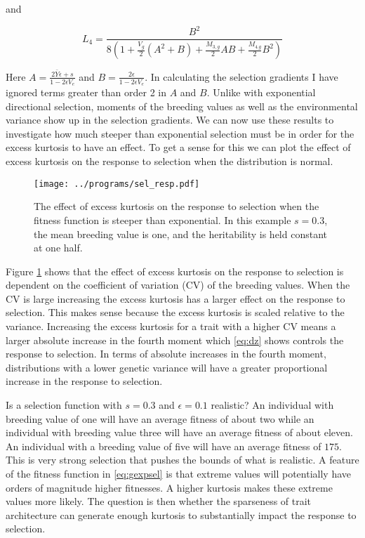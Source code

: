 and

\begin{equation}
  L_4 = \frac{B^2}{8\left( 1 + \frac{V_g}{2}\left( A^2 + B \right) +
  \frac{M_{3,g}}{2}AB + \frac{M_{4.g}}{2}B^2\right)}
\end{equation}

Here $A = \frac{2\bar{Y}\epsilon + s}{1 - 2\epsilon V_e}$ and $B =
\frac{2\epsilon}{1 - 2\epsilon V_e}.$ In calculating the selection gradients I
have ignored terms greater than order 2 in $A$ and $B$. Unlike with exponential
directional selection, moments of the breeding values as well as the
environmental variance show up in the selection gradients. We can now use these
results to investigate how much steeper than exponential selection must be in
order for the excess kurtosis to have an effect. To get a sense for this we can
plot the effect of excess kurtosis on the response to selection when the
distribution is normal.

\begin{figure}[H]
  \texttt{[image: ../programs/sel\_resp.pdf]}
  \caption{The effect of excess kurtosis on the response to selection when the
    fitness function is steeper than exponential. In this example $s=0.3$, the
    mean breeding value is one, and the heritability is held constant at one half.}
  \label{fig:selresp}
\end{figure}

Figure \ref{fig:selresp} shows that the effect of excess kurtosis on the response
to selection is dependent on the coefficient of variation (CV) of the breeding
values. When the CV is large increasing the excess kurtosis has a larger effect
on the response to selection. This makes sense because the excess kurtosis is
scaled relative to the variance. Increasing the excess kurtosis for a trait with
a higher CV means a larger absolute increase in the fourth moment which
\eqref{eq:dz} shows controls the response to selection. In terms of absolute
increases in the fourth moment, distributions with a lower genetic variance will
have a greater proportional increase in the response to selection. 

Is a selection function with $s=0.3$ and $\epsilon=0.1$ realistic? An individual
with breeding value of one will have an average fitness of about two while an
individual with breeding value three will have an average fitness of about
eleven. An individual with a breeding value of five will have an average fitness
of $175$. This is very strong selection that pushes the bounds of what is
realistic. A feature of the fitness function in \eqref{eq:gexpsel} is that
extreme values will potentially have orders of magnitude higher fitnesses. A
higher kurtosis makes these extreme values more likely. The question is then
whether the sparseness of trait architecture can generate enough kurtosis to
substantially impact the response to selection.

